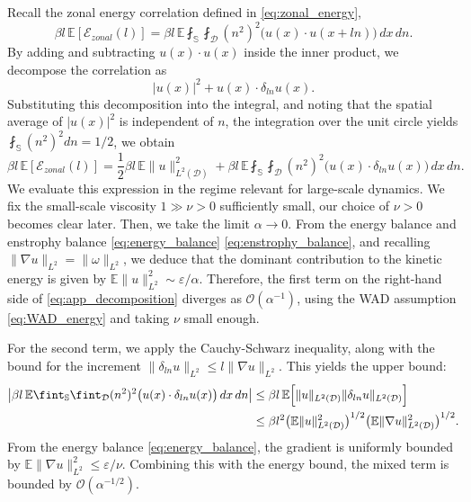 \documentclass[11pt,a4paper]{article}
\numberwithin{equation}{section}
\numberwithin{theorem}{section}
\numberwithin{remark}{section}
\numberwithin{definition}{section}
\begin{document}
Recall the zonal energy correlation defined in \eqref{eq:zonal_energy},
\begin{equation}
    \beta l \, \mathbb{E}[\mathcal{E}_{zonal}(l)] = \beta l \, \mathbb{E} \fint_{\mathbb{S}}\fint_{\mathcal{D}} (n^2)^2 \big( u(x) \cdot u(x+ln) \big) \, dx \, dn.
\end{equation}
By adding and subtracting $u(x) \cdot u(x)$ inside the inner product, we decompose the correlation as
\begin{equation}
    |u(x)|^2 + u(x) \cdot \delta_{ln}u(x).
\end{equation}
Substituting this decomposition into the integral, and noting that the spatial average of $|u(x)|^2$ is independent of $n$, the integration over the unit circle yields $\fint_{\mathbb{S}} (n^2)^2 dn = 1/2$, we obtain
\begin{equation}\label{eq:app_decomposition}
    \beta l \, \mathbb{E}[\mathcal{E}_{zonal}(l)] = \frac{1}{2}\beta l \, \mathbb{E}\|u\|_{L^2(\mathcal{D})}^2 + \beta l \, \mathbb{E} \fint_{\mathbb{S}}\fint_{\mathcal{D}} (n^2)^2 \big( u(x) \cdot \delta_{ln}u(x) \big) \, dx \, dn.
\end{equation}
We evaluate this expression in the regime relevant for large-scale dynamics. We fix the small-scale viscosity $1\gg\nu > 0$  sufficiently small, our choice of $\nu>0$ becomes clear later. Then, we take the limit $\alpha \to 0$. From the energy balance and enstrophy balance \eqref{eq:energy_balance} \eqref{eq:enstrophy_balance}, and recalling $\|\nabla u \|_{L^2} = \|\omega \|_{L^2}$, we deduce that  the dominant contribution to the kinetic energy is given by $\mathbb{E}\|u\|_{L^2}^2 \sim \varepsilon/\alpha$. Therefore, the first term on the right-hand side of \eqref{eq:app_decomposition} diverges as $\mathcal{O}(\alpha^{-1})$, using the WAD assumption \eqref{eq:WAD_energy} and taking $\nu$ small enough.

For the second term, we apply the Cauchy-Schwarz inequality, along with the bound for the increment $\|\delta_{ln}u\|_{L^2} \le l\|\nabla u\|_{L^2}$. This yields the upper bound:
\begin{align}
    \left| \beta l \, \mathbb{E} \fint_{\mathbb{S}}\fint_{\mathcal{D}} (n^2)^2 \big( u(x) \cdot \delta_{ln}u(x) \big) \, dx \, dn \right| 
    &\le \beta l \, \mathbb{E} \Big[ \|u\|_{L^2(\mathcal{D})} \|\delta_{ln}u\|_{L^2(\mathcal{D})} \Big] \notag \\
    &\le \beta l^2 \big(\mathbb{E}\|u\|_{L^2(\mathcal{D})}^2\big)^{1/2} \big(\mathbb{E}\|\nabla u\|_{L^2(\mathcal{D})}^2\big)^{1/2}.
\end{align}
From the energy balance \eqref{eq:energy_balance}, the gradient is uniformly bounded by $\mathbb{E}\|\nabla u\|_{L^2}^2 \le \varepsilon/\nu$. Combining this with the energy bound, the mixed term is bounded by $\mathcal{O}(\alpha^{-1/2})$.
\end{document}

